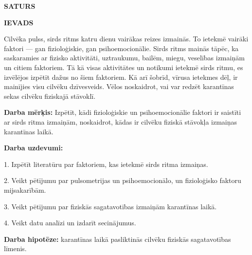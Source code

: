\documentclass[12pt]{article}
\begin{document}
\newpage
\begin{titlepage}
\begin{center}
{\Large\centering\textbf{SATURS}}
\end{center}
\def\contentsname{\empty}
\tableofcontents

\end{titlepage}


\newpage
\begin{titlepage}

\begin{center}
{\Large \bf IEVADS}
\end{center}

Cilvēka pulss, sirds ritms katru dienu vairākas reizes izmainās. To ietekmē vairāki faktori — gan fizioloģiskie, gan psihoemocionālie. Sirds ritms mainās tāpēc, ka saskaramies ar fizisko aktivitāti, uztraukumu, bailēm, miegu, veselības izmaiņām un citiem faktoriem. Tā kā visas aktivitātes un notikumi ietekmē sirds ritmu, es izvēlējos izpētīt dažus no šiem faktoriem. Kā arī šobrīd, vīrusa ietekmes dēļ, ir mainījies visu cilvēku dzīvesveids. Vēlos noskaidrot, vai var redzēt karantīnas sekas cilvēku fiziskajā stāvoklī.

\textbf{Darba mērķis:} Izpētīt, kādi fizioloģiskie un psihoemocionālie faktori ir saistīti ar sirds ritma izmaiņām, noskaidrot, kādas ir cilvēku fiziskā stāvokļa izmaiņas karantīnas laikā. \par
\textbf{Darba uzdevumi:} \par
1.	Izpētīt literatūru par faktoriem, kas ietekmē sirds ritma izmaiņas. \par
2.	Veikt pētījumu par pulsometrijas un psihoemocionālo, un fizioloģisko faktoru mijsakarībām. \par
3.	Veikt pētījumu par fiziskās sagatavotības izmaiņām karantīnas laikā. \par
4.	Veikt datu analīzi un izdarīt secinājumus. \par
\textbf{Darba hipotēze:} karantīnas laikā pasliktinās cilvēku fiziskās sagatavotības līmenis.

\end{titlepage}
\newpage

\newpage

\pagestyle{fancy}
\fancyhf{}
\renewcommand{\headrulewidth}{0pt}
\rfoot{\thepage}
\setcounter{page}{5}

\end{document}
